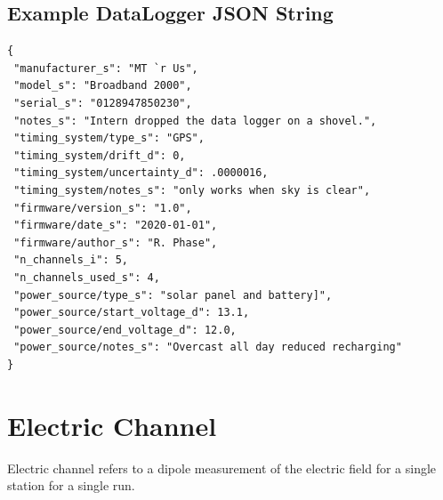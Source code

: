 \documentclass{article}
\begin{document}
\newpage
\subsection{Example DataLogger JSON String}

\begin{verbatim}
{
 "manufacturer_s": "MT `r Us",
 "model_s": "Broadband 2000",
 "serial_s": "0128947850230",
 "notes_s": "Intern dropped the data logger on a shovel.",
 "timing_system/type_s": "GPS",
 "timing_system/drift_d": 0,
 "timing_system/uncertainty_d": .0000016,
 "timing_system/notes_s": "only works when sky is clear",
 "firmware/version_s": "1.0",
 "firmware/date_s": "2020-01-01",
 "firmware/author_s": "R. Phase",
 "n_channels_i": 5,
 "n_channels_used_s": 4,
 "power_source/type_s": "solar panel and battery]",
 "power_source/start_voltage_d": 13.1,
 "power_source/end_voltage_d": 12.0,
 "power_source/notes_s": "Overcast all day reduced recharging"
}
\end{verbatim}

\newpage
\section{Electric Channel}

Electric channel refers to a dipole measurement of the electric field for a single station for a single run.
 
\end{document}
